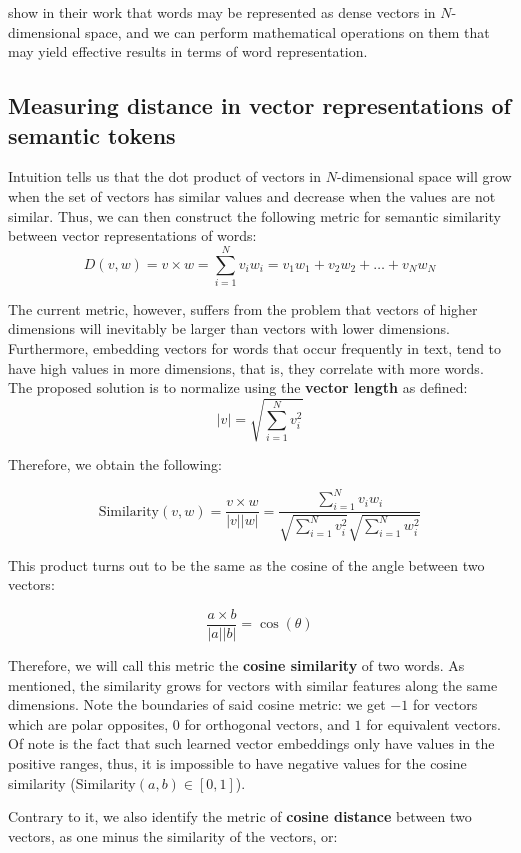 \citet*{mikolov_word2vec_2013} show in their work that words may be represented as dense vectors in $N$-dimensional space, and we can perform mathematical operations on them that may yield effective results in terms of word representation. 

\subsection*{Measuring distance in vector representations of semantic tokens}
Intuition tells us that the dot product of vectors in $N$-dimensional space will grow when the set of vectors has similar values and decrease when the values are not similar. Thus, we can then construct the following metric for semantic similarity between vector representations of words:
$$ D(v,w) = v \times w = \sum_{i=1}^{N} v_i w_i = v_1 w_1 + v_2 w_2 + \dots + v_N w_N $$ 

The current metric, however, suffers from the problem that vectors of higher dimensions will inevitably be larger than vectors with lower dimensions. Furthermore, embedding vectors for words that occur frequently in text, tend to have high values in more dimensions, that is, they correlate with more words. The proposed solution is to normalize using the \textbf{vector length} as defined:
$$ | v| = \sqrt{\sum_{i=1}^{N}v_i^2}$$

Therefore, we obtain the following:

$$ \text{Similarity} (v, w) = \frac{v \times w}{|v| |w|} = \frac{\sum_{i=1}^{N} v_i w_i}{\sqrt{\sum_{i=1}^{N}v_i^2} \sqrt{\sum_{i=1}^{N}w_i^2}}$$

This product turns out to be the same as the cosine of the angle between two vectors:

$$ \frac{a \times b}{|a| |b|} = \cos(\theta) $$

Therefore, we will call this metric the \textbf{cosine similarity} of two words. As mentioned, the similarity grows for vectors with similar features along the same dimensions. Note the boundaries of said cosine metric: we get $-1$ for vectors which are polar opposites, $0$ for orthogonal vectors, and $1$ for equivalent vectors. Of note is the fact that such learned vector embeddings only have values in the positive ranges, thus, it is impossible to have negative values for the cosine similarity (Similarity$(a,b) \in [0,1]$).

Contrary to it, we also identify the metric of \textbf{cosine distance} between two vectors, as one minus the similarity of the vectors, or:

